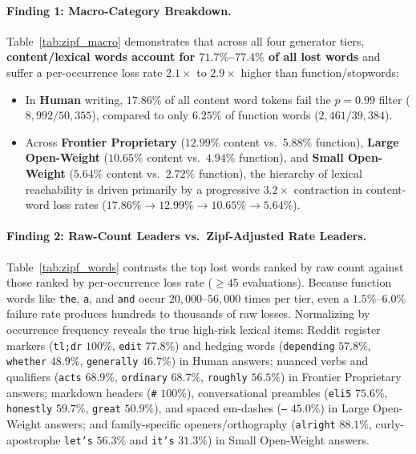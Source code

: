 \documentclass[11pt]{article}
\begin{document}
\paragraph{Finding 1: Macro-Category Breakdown.}
Table~\ref{tab:zipf_macro} demonstrates that across all four generator tiers, \textbf{content/lexical words account for $71.7\%$--$77.4\%$ of all lost words} and suffer a per-occurrence loss rate $2.1\times$ to $2.9\times$ higher than function/stopwords:
\begin{itemize}
    \item In \textbf{Human} writing, $17.86\%$ of all content word tokens fail the $p=0.99$ filter ($8,992 / 50,355$), compared to only $6.25\%$ of function words ($2,461 / 39,384$).
    \item Across \textbf{Frontier Proprietary} ($12.99\%$ content vs.\ $5.88\%$ function), \textbf{Large Open-Weight} ($10.65\%$ content vs.\ $4.94\%$ function), and \textbf{Small Open-Weight} ($5.64\%$ content vs.\ $2.72\%$ function), the hierarchy of lexical reachability is driven primarily by a progressive $3.2\times$ contraction in content-word loss rates ($17.86\% \to 12.99\% \to 10.65\% \to 5.64\%$).
\end{itemize}

\paragraph{Finding 2: Raw-Count Leaders vs.\ Zipf-Adjusted Rate Leaders.}
Table~\ref{tab:zipf_words} contrasts the top lost words ranked by raw count against those ranked by per-occurrence loss rate ($\ge 45$ evaluations). Because function words like \texttt{the}, \texttt{a}, and \texttt{and} occur $20{,}000$--$56{,}000$ times per tier, even a $1.5\%$--$6.0\%$ failure rate produces hundreds to thousands of raw losses. Normalizing by occurrence frequency reveals the true high-risk lexical items: Reddit register markers (\texttt{tl;dr} $100\%$, \texttt{edit} $77.8\%$) and hedging words (\texttt{depending} $57.8\%$, \texttt{whether} $48.9\%$, \texttt{generally} $46.7\%$) in Human answers; nuanced verbs and qualifiers (\texttt{acts} $68.9\%$, \texttt{ordinary} $68.7\%$, \texttt{roughly} $56.5\%$) in Frontier Proprietary answers; markdown headers (\texttt{\#} $100\%$), conversational preambles (\texttt{eli5} $75.6\%$, \texttt{honestly} $59.7\%$, \texttt{great} $50.9\%$), and spaced em-dashes (\texttt{---} $45.0\%$) in Large Open-Weight answers; and family-specific openers/orthography (\texttt{alright} $88.1\%$, curly-apostrophe \texttt{let's} $56.3\%$ and \texttt{it's} $31.3\%$) in Small Open-Weight answers.
\end{document}
